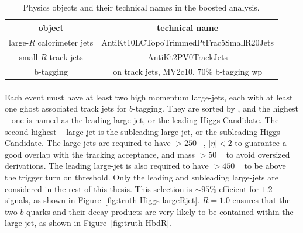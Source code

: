 \begin{table}[bhp]
\caption{Physics objects and their technical names in the boosted analysis.} %
\begin{center}
\begin{tabular}{c|c}
  object & technical name \\
  \hline
  large-$R$ calorimeter jets & AntiKt10LCTopoTrimmedPtFrac5SmallR20Jets \\
  small-$R$ track jets       & AntiKt2PV0TrackJets \\
  b-tagging                  & on track jets, MV2c10, $70\%$ b-tagging wp \\
\end{tabular}
\label{tab:boosted-objects}
\end{center}
\end{table}

\paragraph{}
Each event must have at least two high momentum large-\R jets, each with at least one ghost associated track jets for $b$-tagging.
They are sorted by \pt, and the highest \pt~ one is named as the leading large-\R jet, or the leading Higgs Candidate.
The second highest \pt~ large-\R jet is the subleading large-\R jet, or the subleading Higgs Candidate.
The large-\R jets are required to have \pt $> 250$ \GeV~, $|\eta| < 2$ to guarantee a good overlap with the tracking acceptance, and mass $> 50$ \GeV~ to avoid oversized derivations.
The leading large-\R jet is also required to have \pt $> 450$ \GeV~ to be above the trigger turn on threshold.
Only the leading and subleading large-\R jets are considered in the rest of this thesis.
This selection is $\sim 95\%$ efficient for $1.2$ \TeV signals, as shown in Figure~\ref{fig:truth-Higgs-largeRjet}. 
$R = 1.0$ ensures that the two $b$ quarks and their decay products are very likely to be contained within the large-\R jet, as shown in Figure~\ref{fig:truth-HbdR}. 

